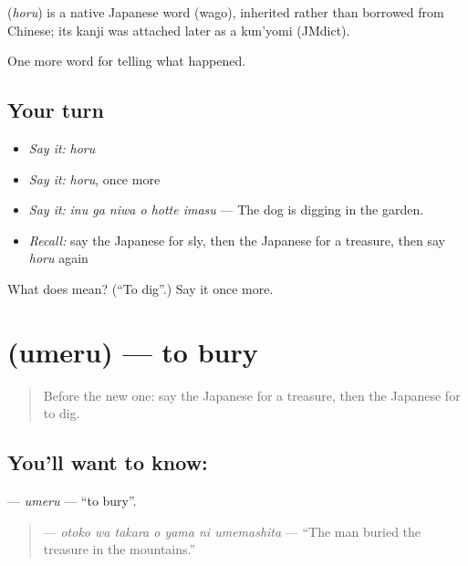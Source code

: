 \begin{cousinweb}
\textbf{} (\emph{horu}) is a native Japanese word (wago), inherited rather than borrowed from Chinese; its kanji was attached later as a kun'yomi (JMdict).
\end{cousinweb}

\begin{grammarlens}[title={What you've built}]
One more word for telling what happened.
\end{grammarlens}

\subsection*{Your turn}
\begin{itemize}
\raggedright
  \item \emph{Say it:} \emph{horu}
  \item \emph{Say it:} \emph{horu}, once more
  \item \emph{Say it:} \emph{inu ga niwa o hotte imasu} — The dog is digging in the garden.
  \item \emph{Recall:} say the Japanese for sly, then the Japanese for a treasure, then say \emph{horu} again
\end{itemize}

\begin{tcolorbox}[breakable,colback=teal!4,colframe=teal!35!black,title={Before you move on}]
What does  mean? (\textquotedblleft{}To dig\textquotedblright{}.) Say it once more.
\end{tcolorbox}
\section[\texorpdfstring{\ja{うめる} (umeru)}{うめる (umeru)}]{ (umeru) — to bury}

\label{lesson:JA-C301-umeru}



\begin{quote}
Before the new one: say the Japanese for a treasure, then the Japanese for to dig.
\end{quote}

\subsection*{You'll want to know: }
\textbf{} — \emph{umeru} — \textquotedblleft{}to bury\textquotedblright{}.

\begin{quote}
\textbf{   } — \emph{otoko wa takara o yama ni umemashita} — \textquotedblleft{}The man buried the treasure in the mountains.\textquotedblright{}
\end{quote}

